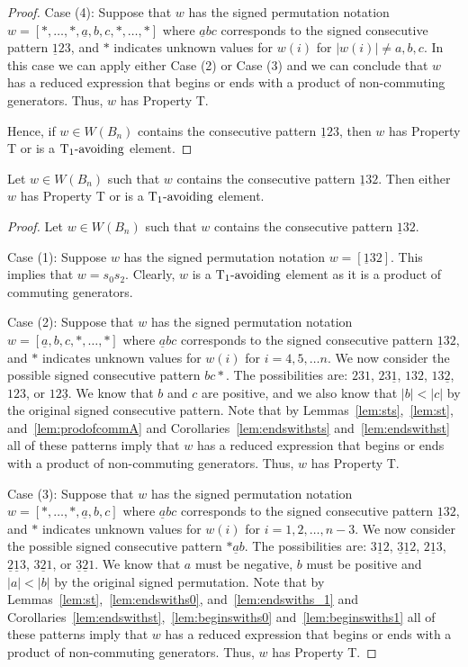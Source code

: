 \begin{lemma}
\begin{proof}
	Case (4): Suppose that $w$ has the signed permutation notation $w=[\ast, \ldots, \ast, \underline{a},b,c, \ast, \ldots, \ast]$ where $\underline{a}bc$ corresponds to the signed consecutive pattern $\underline{1}23$, and $\ast$ indicates unknown values for $w(i)$ for $|w(i)|\neq a,b,c$. In this case we can apply either Case (2) or Case (3) and we can conclude that $w$ has a reduced expression that begins or ends with a product of non-commuting generators. Thus, $w$ has Property T.

	Hence, if $w \in W(B_n)$ contains the consecutive pattern $\underline{1}23$, then $w$ has Property T or is a $\operatorname{T_1-\mathrm{avoiding}}$ element.
\end{proof}	
\end{lemma}

\begin{lemma}\label{lem:132}
Let $w \in W(B_n)$ such that $w$ contains the consecutive pattern $\underline{1}32$. Then either $w$ has Property T or is a $\operatorname{T_1-\mathrm{avoiding}}$ element.
\begin{proof}
	Let $w \in W(B_n)$ such that $w$ contains the consecutive pattern $\underline{1}32$.
	
	Case (1): Suppose $w$ has the signed permutation notation $w=[\underline{1}32]$. This implies that $w=s_0s_2$. Clearly, $w$ is a $\operatorname{T_1-\mathrm{avoiding}}$ element as it is a product of commuting generators.
	
	Case (2): Suppose that $w$ has the signed permutation notation $w=[\underline{a},b,c, \ast, \ldots, \ast]$ where $\underline{a}bc$ corresponds to the signed consecutive pattern $\underline{1}32$, and $\ast$ indicates unknown values for $w(i)$ for $i=4,5, \ldots n$. We now consider the possible signed consecutive pattern $bc \ast$. The possibilities are: $231$, $23 \underline{1}$, $13 2$, $13 \underline{2}$, $123$, or $12\underline{3}$. We know that $b$ and $c$ are positive, and we also know that $|b|<|c|$ by the original signed consecutive pattern. Note that by Lemmas~\ref{lem:sts},~\ref{lem:st}, and~\ref{lem:prodofcommA} and Corollaries~\ref{lem:endswithsts} and~\ref{lem:endswithst} all of these patterns imply that $w$ has a reduced expression that begins or ends with a product of non-commuting generators. Thus, $w$ has Property T.
	
	Case (3): Suppose that $w$ has the signed permutation notation $w=[\ast, \ldots, \ast, \underline{a},b,c]$ where $\underline{a}bc$ corresponds to the signed consecutive pattern $\underline{1}32$, and $\ast$ indicates unknown values for $w(i)$ for $i=1,2, \ldots ,n-3$. We now consider the possible signed consecutive pattern $\ast \underline{a} b$. The possibilities are: $3 \underline{1} 2$, $\underline{3} \underline{1} 2$, $2 \underline{1} 3$, $\underline{2} \underline{1} 3$, $3 \underline{2} 1$, or $\underline{3} \underline{2} 1$. We know that $a$ must be negative, $b$ must be positive and $|a|<|b|$ by the original signed permutation. Note that by Lemmas~\ref{lem:st},~\ref{lem:endswiths0}, and~\ref{lem:endswiths_1} and Corollaries~\ref{lem:endswithst},~\ref{lem:beginswiths0} and~\ref{lem:beginswiths1} all of these patterns imply that $w$ has a reduced expression that begins or ends with a product of non-commuting generators. Thus, $w$ has Property T. 
	

\end{proof}
\end{lemma}

